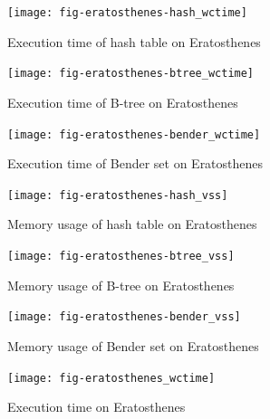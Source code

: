 \documentclass{acm_proc_article-sp}
\begin{document}





\begin{figure}[p]
\centering
\texttt{[image: fig-eratosthenes-hash\_wctime]}
\caption{Execution time of hash table on Eratosthenes}
\label{fig-eratosthenes-hash_wctime}
\end{figure}

\begin{figure}[p]
\centering
\texttt{[image: fig-eratosthenes-btree\_wctime]}
\caption{Execution time of B-tree on Eratosthenes}
\label{fig-eratosthenes-btree_wctime}
\end{figure}

\begin{figure}[p]
\centering
\texttt{[image: fig-eratosthenes-bender\_wctime]}
\caption{Execution time of Bender set on Eratosthenes}
\label{fig-eratosthenes-bender_wctime}
\end{figure}

\begin{figure}[p]
\centering
\texttt{[image: fig-eratosthenes-hash\_vss]}
\caption{Memory usage of hash table on Eratosthenes}
\label{fig-eratosthenes-hash_vss}
\end{figure}

\begin{figure}[p]
\centering
\texttt{[image: fig-eratosthenes-btree\_vss]}
\caption{Memory usage of B-tree on Eratosthenes}
\label{fig-eratosthenes-btree_vss}
\end{figure}

\begin{figure}[p]
\centering
\texttt{[image: fig-eratosthenes-bender\_vss]}
\caption{Memory usage of Bender set on Eratosthenes}
\label{fig-eratosthenes-bender_vss}
\end{figure}

\begin{figure}[p]
\centering
\texttt{[image: fig-eratosthenes\_wctime]}
\caption{Execution time on Eratosthenes}
\label{fig-eratosthenes_wctime}
\end{figure}
\end{document}
